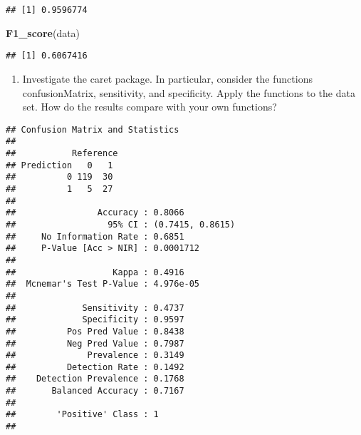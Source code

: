\documentclass[]{article}
\newenvironment{Shaded}{\begin{snugshade}}{\end{snugshade}}
\newcommand{\KeywordTok}[1]{\textcolor[rgb]{0.13,0.29,0.53}{\textbf{#1}}}
\newcommand{\DataTypeTok}[1]{\textcolor[rgb]{0.13,0.29,0.53}{#1}}
\newcommand{\StringTok}[1]{\textcolor[rgb]{0.31,0.60,0.02}{#1}}
\newcommand{\OperatorTok}[1]{\textcolor[rgb]{0.81,0.36,0.00}{\textbf{#1}}}
\newcommand{\NormalTok}[1]{#1}
\providecommand{\tightlist}{%
  \setlength{\itemsep}{0pt}\setlength{\parskip}{0pt}}
\begin{document}
\begin{verbatim}
## [1] 0.9596774
\end{verbatim}

\begin{Shaded}
\begin{Highlighting}[]
\KeywordTok{F1_score}\NormalTok{(data)}
\end{Highlighting}
\end{Shaded}

\begin{verbatim}
## [1] 0.6067416
\end{verbatim}

\begin{enumerate}
\def\labelenumi{\arabic{enumi}.}
\setcounter{enumi}{11}
\tightlist
\item
  Investigate the caret package. In particular, consider the functions
  confusionMatrix, sensitivity, and specificity. Apply the functions to
  the data set. How do the results compare with your own functions?
\end{enumerate}

\begin{Shaded}
\end{Shaded}

\begin{verbatim}
## Confusion Matrix and Statistics
## 
##           Reference
## Prediction   0   1
##          0 119  30
##          1   5  27
##                                           
##                Accuracy : 0.8066          
##                  95% CI : (0.7415, 0.8615)
##     No Information Rate : 0.6851          
##     P-Value [Acc > NIR] : 0.0001712       
##                                           
##                   Kappa : 0.4916          
##  Mcnemar's Test P-Value : 4.976e-05       
##                                           
##             Sensitivity : 0.4737          
##             Specificity : 0.9597          
##          Pos Pred Value : 0.8438          
##          Neg Pred Value : 0.7987          
##              Prevalence : 0.3149          
##          Detection Rate : 0.1492          
##    Detection Prevalence : 0.1768          
##       Balanced Accuracy : 0.7167          
##                                           
##        'Positive' Class : 1               
## 
\end{verbatim}
\end{document}
